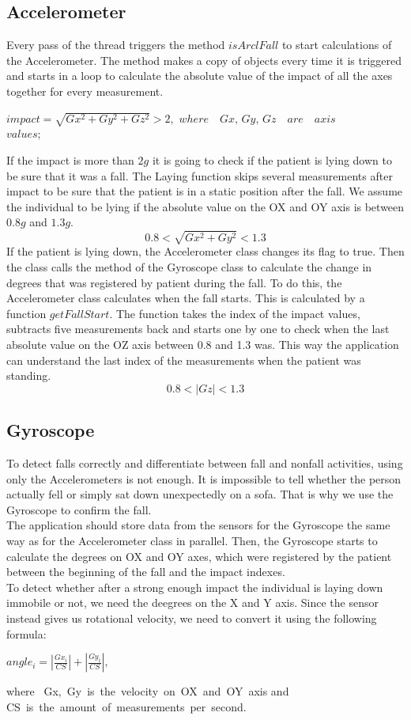 \documentclass[hidelinks,conference,12pt]{IEEETran}
\begin{document}
\subsection{Accelerometer}
Every pass of the thread triggers the method $isArclFall$ to start calculations of the Accelerometer. The method makes a copy of objects every time it is triggered and starts in a loop to calculate the absolute value of the impact of all the axes together for every measurement.
\begin{center}
	$impact = \sqrt{Gx^2 + Gy^2 + Gz^2} > 2,$
	$where \quad \textit{Gx, Gy, Gz} \quad are \quad axis $ \\
	$values;$
\end{center}
If the impact is more than $2g$ it is going to check if the patient is lying down to be sure that it was a fall. The Laying function skips several measurements after impact to be sure that the patient is in a static position after the fall. We assume the individual to be lying if the absolute value on the OX and OY axis is between $0.8g$ and $1.3g$.
$$ 0.8 < \sqrt{Gx^2 + Gy^2} < 1.3 $$
If the patient is lying down, the Accelerometer class changes its flag to true. Then the class calls the method of the Gyroscope class to calculate the change in degrees that was registered by patient during the fall. To do this, the Accelerometer class calculates when the fall starts. This is calculated by a function $getFallStart$. The function takes the index of the impact values, subtracts five measurements back and starts one by one to check when the last absolute value on the OZ axis between 0.8 and 1.3 was. This way the application can understand the last index of the measurements when the patient was standing.
$$ 0.8 < \left|Gz\right| < 1.3 $$

\subsection{Gyroscope}
To detect falls correctly and differentiate between fall and nonfall activities, using only the Accelerometers is not enough. It is impossible to tell whether the person actually fell or simply sat down unexpectedly on a sofa. That is why we use the Gyroscope to confirm the fall.\\
The application should store data from the sensors for the Gyroscope the same way as for the Accelerometer class in parallel. Then, the Gyroscope starts to calculate the degrees on OX and OY axes, which were registered by the patient between the beginning of the fall and the impact indexes. \\
To detect whether after a strong enough impact the individual is laying down immobile or not, we need the deegrees on the X and Y axis. Since the sensor instead gives us rotational velocity, we need to convert it using the following formula:\\
\begin{center}
	$angle_i = \left| \frac{Gx_i}{CS} \right| + \left| \frac{Gy_i}{CS} \right|,$\\
\end{center}
where \ Gx,\ Gy\ is\ the\ velocity\ on\ OX\ and\ OY\ axis and CS\ is\ the\ amount\ of\ measurements\ per\ second.\\
\end{document}
